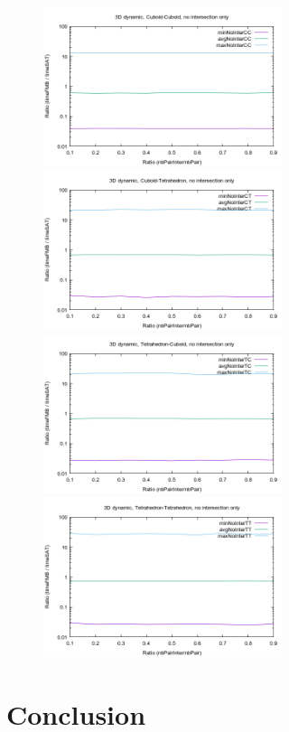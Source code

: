 \documentclass[12pt, a4paper]{article}
\begin{document}
\begin{center}
\begin{figure}[H]
\centering\includegraphics[width=7cm]{../Results/qualification3DTimeCCnointer.png}
\centering\includegraphics[width=7cm]{../Results/qualification3DTimeCTnointer.png}
\centering\includegraphics[width=7cm]{../Results/qualification3DTimeTCnointer.png}
\centering\includegraphics[width=7cm]{../Results/qualification3DTimeTTnointer.png}
\end{figure}
\end{center}

\section{Conclusion}
\end{document}
